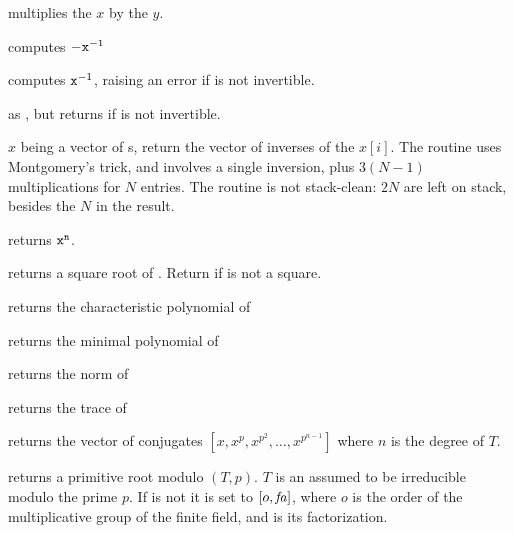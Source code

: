 


 multiplies the  $x$
by the  $y$.



 computes $-{\tt x}^{-1}$

 computes ${\tt x}^{-1}$, raising an
error if  is not invertible.

 as , but returns
 if  is not invertible.

 $x$ being a vector of s,
return the vector of inverses of the $x[i]$. The routine uses Montgomery's
trick, and involves a single inversion, plus $3(N-1)$ multiplications for
$N$ entries. The routine is not stack-clean: $2N$  are left on
stack, besides the $N$ in the result.

 returns ${\tt x}^{\tt n}$.

 returns a square root of .
Return  if  is not a square.

 returns the characteristic
polynomial of 

 returns the minimal polynomial
of 

 returns the norm of 

 returns the trace of 

 returns the vector of conjugates
$[x,x^p,x^{p^2},\ldots,x^{p^{n-1}}]$ where $n$ is the degree of $T$.

 returns a primitive root modulo
$(T,p)$. $T$ is an  assumed to be irreducible modulo the prime
$p$. If  is not  it is set to $[o,\hbox{\it fa\/}]$, where $o$ is
the order of the multiplicative group of the finite field, and  is
its factorization.

